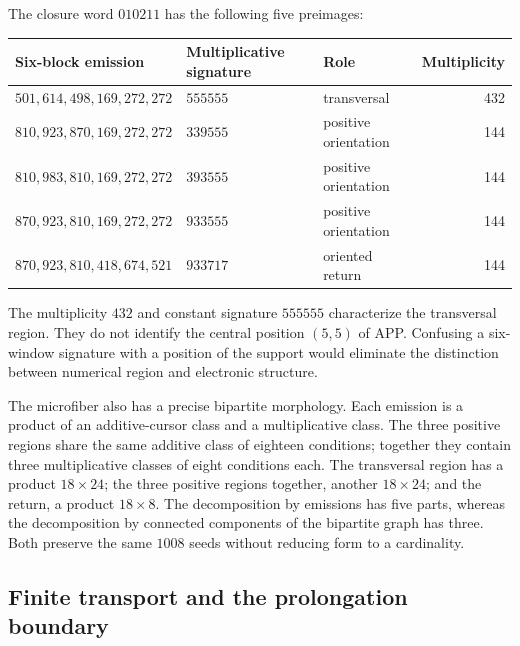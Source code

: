 The closure word \(010211\) has the following five preimages:
\begin{center}\small
\begin{tabular}{@{}lll r@{}}\toprule
Six-block emission&Multiplicative signature&Role&Multiplicity\\\midrule
\(501,614,498,169,272,272\)&\(555555\)&transversal&432\\
\(810,923,870,169,272,272\)&\(339555\)&positive orientation&144\\
\(810,983,810,169,272,272\)&\(393555\)&positive orientation&144\\
\(870,923,810,169,272,272\)&\(933555\)&positive orientation&144\\
\(870,923,810,418,674,521\)&\(933717\)&oriented return&144\\\bottomrule
\end{tabular}
\end{center}
The multiplicity \(432\) and constant signature \(555555\) characterize the transversal region. They do not identify the central position \((5,5)\) of APP. Confusing a six-window signature with a position of the support would eliminate the distinction between numerical region and electronic structure.

The microfiber also has a precise bipartite morphology. Each emission is a product of an additive-cursor class and a multiplicative class. The three positive regions share the same additive class of eighteen conditions; together they contain three multiplicative classes of eight conditions each. The transversal region has a product \(18\times24\); the three positive regions together, another \(18\times24\); and the return, a product \(18\times8\). The decomposition by emissions has five parts, whereas the decomposition by connected components of the bipartite graph has three. Both preserve the same \(1008\) seeds without reducing form to a cardinality.





\subsection{Finite transport and the prolongation boundary}

